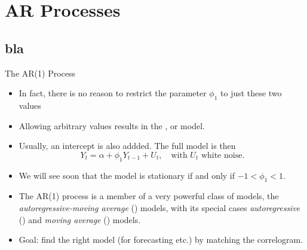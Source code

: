 

\frame{\titlepage}


\section{AR Processes}\subsection*{bla}
\begin{frame}{The AR(1) Process}
\begin{itemize}
\item In fact, there is no reason to restrict the parameter $\phi_1$ to just these two values
\item Allowing arbitrary values results in the , or  model.
\item Usually, an intercept is also addded. The full model is then
\begin{equation*}
Y_t=\alpha +\phi_1 Y_{t-1}+ U_t, \quad  \text{with $U_t$ white noise.}
\end{equation*}
\item We will see soon that the model is stationary if and only if $-1<\phi_1 <1$.
\item The AR(1) process is a member of a very powerful class of models, the \emph{\color{red}%
autoregressive-moving average} () models, with its special cases
\emph{\color{red}autoregressive} () and \emph{\color{red}moving average} () models.

\item Goal: find the right model (for forecasting etc.) by matching the correlogram.
\end{itemize}
\end{frame}
